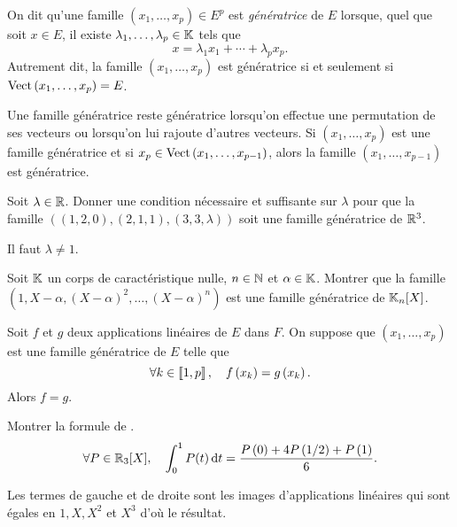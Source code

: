 \documentclass{magnolia}
\begin{document}
\begin{definition}[utile=-3]
On dit qu'une famille $(x_1,\ldots,x_p)\in E^p$ est \emph{génératrice} de $E$ lorsque, quel que soit
$x\in E$, il existe $\lambda_1,\ldots,\lambda_p\in\mathbb{K}$ tels que
\[x=\lambda_1 x_1+\cdots+\lambda_p x_p.\]
Autrement dit, la famille $(x_1,\ldots,x_p)$ est génératrice si et seulement si
$\operatorname{Vect}\left(x_1,\ldots,x_p\right)=E$.
\end{definition}

\begin{remarques}
\remarque Une famille génératrice reste génératrice lorsqu'on effectue une
  permutation de ses vecteurs ou lorsqu'on lui rajoute d'autres vecteurs.
\remarque Si $(x_1,\ldots,x_p)$ est une famille génératrice et si
  $x_p\in\operatorname{Vect}\left(x_1,\ldots,x_{p-1}\right)$, alors la famille $(x_1,\ldots,x_{p-1})$ est
  génératrice.
\end{remarques}


\begin{exos}
  \exo Soit $\lambda\in\mathbb{R}$. Donner une condition nécessaire et suffisante sur
    $\lambda$ pour que la famille $((1,2,0), (2,1,1), (3,3,\lambda))$
    soit une famille génératrice de $\mathbb{R}^3$.
    \begin{sol}
    Il faut $\lambda\neq 1$.
    \end{sol}
  \exo Soit $\mathbb{K}$ un corps de caractéristique nulle, $n\in\mathbb{N}$ et $\alpha\in\mathbb{K}$. Montrer que la famille
    $(1,X-\alpha,(X-\alpha)^2,\ldots,(X-\alpha)^n)$ est une famille génératrice de $\polyK[n]$.
  \end{exos}


\begin{proposition}[utile=-2]
Soit $f$ et $g$ deux applications linéaires de $E$ dans $F$. On suppose que
$(x_1,\ldots,x_p)$ est une famille génératrice de $E$ telle que
\[\forall k\in\left\llbracket 1,p\right\rrbracket ,\quad f\left(x_k\right)=g\left(x_k\right).\]
Alors $f=g$.
\end{proposition}
  
\begin{exoUnique}
\exo Montrer la formule de .
  \[\forall P\in\polyR[3] \qsep \integ{0}{1}{P(t)}{t}=
    \frac{P\p{0}+4P\p{1/2}+P\p{1}}{6}.\]
    \begin{sol}
    Les termes de gauche et de droite sont les images d'applications linéaires qui sont égales en $1, X, X^2$ et $X^3$ d'où le résultat.
    \end{sol}
\end{exoUnique}
\end{document}
